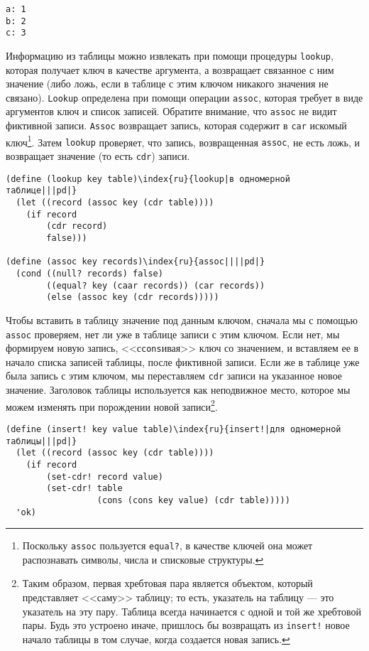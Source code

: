 \begin{Verbatim}[fontsize=\small]
a: 1
b: 2
c: 3
\end{Verbatim}

Информацию из таблицы можно извлекать при помощи процедуры
{\tt lookup}, которая получает ключ в качестве аргумента, а
возвращает связанное с ним значение (либо ложь, если в таблице с
этим ключом никакого значения не связано). {\tt Lookup} определена
при помощи операции {\tt assoc}, которая требует в виде
аргументов ключ и список записей.  Обратите внимание, что
{\tt assoc} не видит фиктивной записи. {\tt Assoc}
возвращает запись, которая содержит в {\tt car} искомый
ключ\footnote{Поскольку {\tt assoc} пользуется
{\tt equal?}, в качестве ключей она может распознавать символы,
числа и списковые структуры.
}.
Затем {\tt lookup} проверяет, что запись, возвращенная
{\tt assoc}, не есть ложь, и возвращает значение (то есть
{\tt cdr}) записи.

\begin{Verbatim}[fontsize=\small]
(define (lookup key table)\index{ru}{lookup|в одномерной таблице|||pd|}
  (let ((record (assoc key (cdr table))))
    (if record
        (cdr record)
        false)))

(define (assoc key records)\index{ru}{assoc||||pd|}
  (cond ((null? records) false)
        ((equal? key (caar records)) (car records))
        (else (assoc key (cdr records)))))
\end{Verbatim}

Чтобы вставить в таблицу значение под данным ключом,
сначала мы с помощью {\tt assoc} проверяем, нет ли уже в
таблице записи с этим ключом.  Если нет, мы формируем новую запись,
<<с{\tt cons}ивая>> ключ со значением, и вставляем ее в начало
списка записей таблицы, после фиктивной записи.  Если же в таблице уже
была запись с этим ключом, мы переставляем {\tt cdr} записи на
указанное новое значение.  Заголовок таблицы используется как неподвижное
место, которое мы можем изменять при порождении новой
записи\footnote{Таким образом, первая хребтовая пара является объектом,
который представляет <<саму>> таблицу; то есть, указатель на таблицу
--- это указатель на эту пару.  Таблица всегда начинается с одной и
той же хребтовой пары.  Будь это устроено иначе, пришлось бы
возвращать из {\tt insert!} новое начало таблицы в
том случае, когда создается новая запись.
}.

\begin{Verbatim}[fontsize=\small]
(define (insert! key value table)\index{ru}{insert!|для одномерной таблицы|||pd|}
  (let ((record (assoc key (cdr table))))
    (if record
        (set-cdr! record value)
        (set-cdr! table
                  (cons (cons key value) (cdr table)))))
  'ok)
\end{Verbatim}

